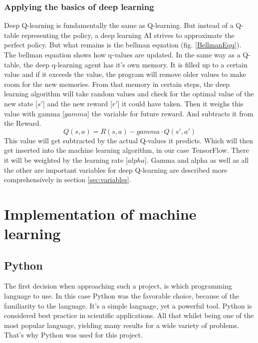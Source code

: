 \documentclass[12pt]{article}
\def\alpha{alpha}%
\def\gamma{gamma}%
\begin{document}
\subsubsection{Applying the basics of deep learning}
Deep Q-learning is fundamentally the same as Q-learning. But instead of a Q-table representing the policy, a deep learning AI strives to approximate the perfect policy. But what remains is the bellman equation (fig. \ref{BellmanEqu}). The bellman equation shows how q-values are updated. In the same way as a Q-table, the deep q-learning agent has it's own memory. It is filled up to a certain value and if it exceeds the value, the program will remove older values to make room for the new memories. From that memory in certain steps, the deep learning algorithm will take random values and check for the optimal value of the new state [$s'$] and the new reward [$r'$] it could have taken. Then it weighs this value with gamma [$\gamma$] the variable for future reward. And subtracts it from the Reward. \cite{bellmanEquValue}
\[Q(s,a) = R(s,a) - \gamma\cdot Q(s',a')\]
This value will get subtracted by the actual Q-values it predicts. Which will then get inserted into the machine learning algorithm, in our case TensorFlow. There it will be weighted by the learning rate [$\alpha$]. Gamma and alpha as well as all the other are important variables for deep Q-learning are described more comprehensively in section \ref{sec:variables}.

\section{Implementation of machine learning}
\subsection{Python}
The first decision when approaching such a project, is which programming language to use. In this case Python was the favorable choice, because of the familiarity to the language. It's a simple language, yet a powerful tool. Python is considered best practice in scientific applications. All that whilst being one of the most popular language, yielding many results for a wide variety of problems. That's why Python was used for this project. \cite{Python} 
\end{document}
